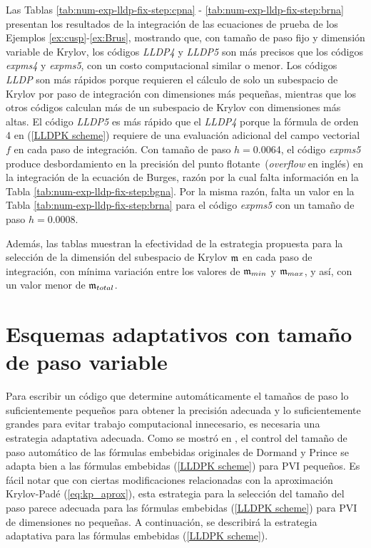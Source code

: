 Las Tablas \ref{tab:num-exp-lldp-fix-step:cpna} - \ref{tab:num-exp-lldp-fix-step:brna} presentan los resultados de la integración de las ecuaciones de prueba de los Ejemplos \ref{ex:cusp}-\ref{ex:Brus}, mostrando que, con tamaño de paso fijo y dimensión variable de Krylov, los códigos \emph{LLDP4} y \emph{LLDP5} son más precisos que los códigos \emph{expms4} y \emph{expms5}, con un costo computacional similar o menor. Los códigos \emph{LLDP} son más rápidos porque requieren el cálculo de solo un subespacio de Krylov por paso de integración con dimensiones más pequeñas, mientras que los otros códigos calculan más de un subespacio de Krylov con dimensiones más altas. El código \emph{LLDP5} es más rápido que el \emph{LLDP4} porque la fórmula de orden 4 en (\ref{LLDPK scheme}) requiere de una evaluación adicional del campo vectorial $f$ en cada paso de integración. Con tamaño de paso $h = 0$.0064, el código \emph{expms5} produce desbordamiento en la precisión del punto flotante~(\textit{overflow} en inglés) en la integración de la ecuación de Burges, razón por la cual falta información en la Tabla \ref{tab:num-exp-lldp-fix-step:bgna}. Por la misma razón, falta un valor en la Tabla \ref{tab:num-exp-lldp-fix-step:brna} para el código \emph{expms5} con un tamaño de paso $h = 0$.0008.

Además, las tablas muestran la efectividad de la estrategia propuesta para la selección de la dimensión del subespacio de Krylov $\mathfrak{m}$ en cada paso de integración, con mínima variación entre los valores de $\mathfrak{m}_{min}$ y $\mathfrak{m}_{max}$, y así, con un valor menor de $\mathfrak{m}_{total}$.


\section{Esquemas adaptativos con tamaño de paso variable}
Para escribir un código que determine automáticamente el tamaños de paso lo suficientemente pequeños para obtener la precisión adecuada y lo suficientemente grandes para evitar trabajo computacional innecesario, es necesaria una estrategia adaptativa adecuada. Como se mostró en \cite{Jimenez14AMC}, el control del tamaño de paso automático de las fórmulas embebidas originales de Dormand y Prince se adapta bien a las fórmulas embebidas (\ref{LLDPK scheme}) para PVI pequeños. Es fácil notar que con ciertas modificaciones relacionadas con la aproximación Krylov-Padé (\ref{eq:kp_aprox}), esta estrategia para la selección del tamaño del paso parece adecuada para las fórmulas embebidas (\ref{LLDPK scheme}) para PVI de dimensiones no pequeñas. A continuación, se describirá la estrategia adaptativa para las fórmulas embebidas (\ref{LLDPK scheme}).

